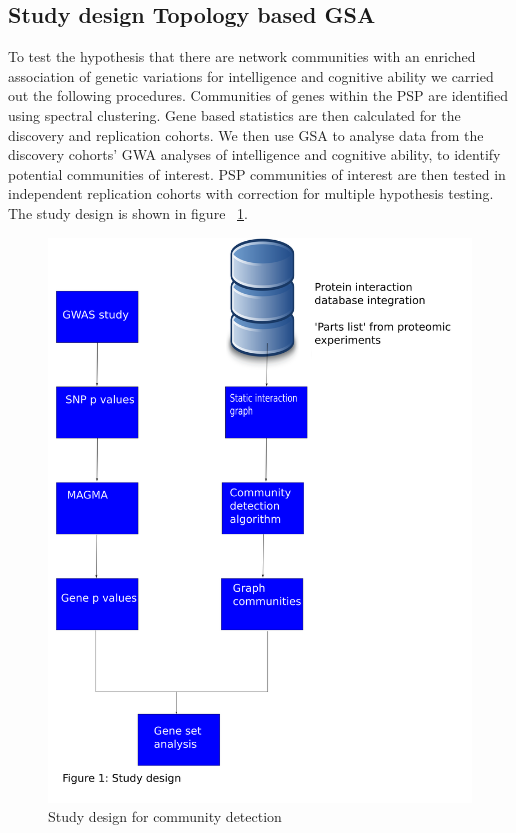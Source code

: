 \subsection{Study design Topology based GSA}
To test the hypothesis that there are network communities with an enriched association of genetic variations for intelligence and cognitive ability we carried out the following procedures.
Communities of genes within the PSP are identified using spectral clustering. Gene based statistics are then calculated for the discovery and replication cohorts. We then use GSA to analyse data from the discovery cohorts’ GWA analyses of intelligence and cognitive ability, to identify potential communities of interest. PSP communities of interest are then tested in independent replication cohorts with correction for multiple hypothesis testing. The study design is shown in figure ~\ref{fig:study design community detection}.

\begin{figure}
    \centering
    \includegraphics[width=\textwidth]{images/study_design.png}  
    \caption{Study design for community detection}
    \label{fig:study design community detection}
\end{figure}

